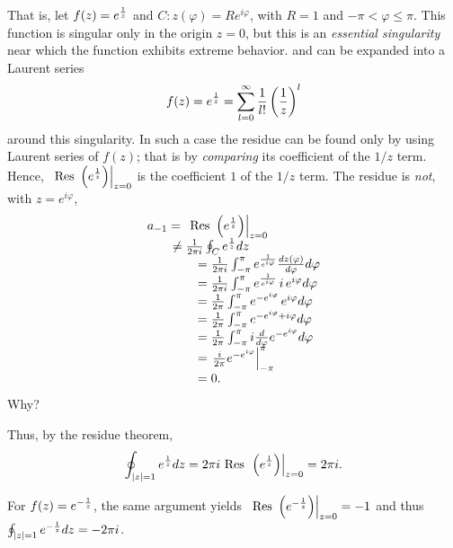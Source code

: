 {\begin{enumerate}
That is, let $f(z) = e^{1\over z}$ and $C: z(\varphi )=R e^{i\varphi}$, with $R=1$ and $-\pi < \varphi \le \pi$.
This function is singular only in the origin $z=0$,
but this is an {\em essential singularity} near which the function exhibits extreme behavior.
and can be expanded into a Laurent series
$$
f(z) = e^{1\over z} =\sum_{l=0}^\infty \frac{1}{l!}   \left(\frac{1}{z}\right)^l
$$
around this singularity.
In such a case the residue can be found only by using Laurent series of $f(z)$;
that is by {\em comparing} its coefficient  of the $1/z$ term.
Hence,  $\left.\textrm{ Res }\left( e^{1\over z} \right) \right|_{z=0}$
is the coefficient $1$ of the $1/z$ term.
The residue is {\em not},  with $z=e^{i\varphi}$,
\begin{equation}
\begin{array}{l}
a_{-1}= \left.\textrm{ Res }\left( e^{1\over z} \right) \right|_{z=0}  \\
\qquad \neq {1\over 2\pi i}\oint_C e^{1\over z}dz \\
\qquad \qquad = {1\over 2\pi i}\int_{-\pi}^\pi  e^{1\over e^{i\varphi}}\frac{dz(\varphi )}{d\varphi } d\varphi  \\
\qquad \qquad = {1\over 2\pi i}\int_{-\pi}^\pi  e^{1\over e^{i\varphi}}\, i\, e^{i\varphi} d\varphi    \\
\qquad \qquad = {1\over 2\pi }\int_{-\pi}^\pi  e^{- e^{i\varphi}}\,  e^{i\varphi} d\varphi    \\
\qquad \qquad = {1\over 2\pi }\int_{-\pi}^\pi  e^{- e^{i\varphi}+i\varphi} d\varphi    \\
\qquad \qquad = {1\over 2\pi }\int_{-\pi}^\pi i\frac{d}{d\varphi}  e^{- e^{i\varphi}} d\varphi    \\
\qquad \qquad = \left.{i\over 2\pi } e^{- e^{i\varphi}}\right|_{-\pi}^\pi   \\
\qquad \qquad =  0.
\end{array}
\end{equation}
Why?

Thus, by the residue theorem,
\begin{equation}
\oint_{\vert z\vert =1}
e^{1\over z} dz
=
2\pi i
\textrm{ Res }\left. \left( e^{1\over z} \right)\right|_{z=0} = 2\pi i.
\end{equation}

For $f(z) = e^{-{1\over z}}$, the same argument yields  $\left.\textrm{ Res }\left( e^{-{1\over z}} \right) \right|_{z=0} = -1$
and thus  $
\oint_{\vert z\vert =1}
e^{-{1\over z}} dz =  -2\pi i$.



\end{enumerate}
\eexample
}



